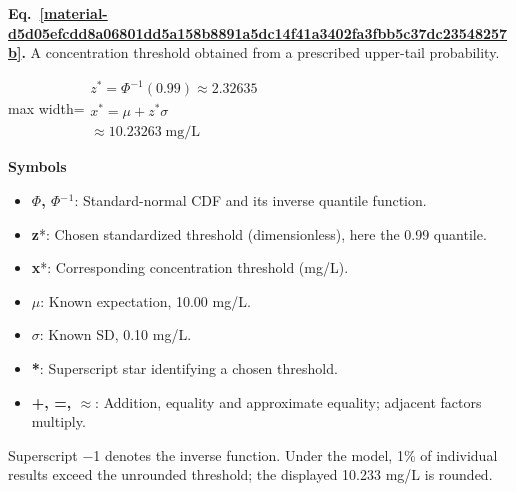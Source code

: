 \documentclass[11pt,a4paper]{article}
\begin{document}
\par\medskip
\begin{samepage}
\label{material-d5d05efcdd8a06801dd5a158b8891a5dc14f41a3402fa3fbb5c37dc23548257b}
\noindent\textbf{Eq.~\ref*{material-d5d05efcdd8a06801dd5a158b8891a5dc14f41a3402fa3fbb5c37dc23548257b}.} A concentration threshold obtained from a prescribed upper-tail probability.\par\nopagebreak
\begin{center}\begin{adjustbox}{max width=\linewidth}$\displaystyle \begin{gathered}z^*=\Phi^{-1}(0.99)\approx2.32635\\x^*=\mu+z^*\sigma\\\approx10.23263\;\mathrm{mg/L}\end{gathered}$\end{adjustbox}\end{center}

\par\noindent\textbf{Symbols}

\begin{itemize}\setlength{\itemsep}{1pt}\setlength{\parsep}{0pt}
\item \textbf{\ensuremath{\Phi}, \ensuremath{\Phi}\ensuremath{{}^-}\ensuremath{{}^1}}: Standard-normal CDF and its inverse quantile function.
\item \textbf{z}*: Chosen standardized threshold (dimensionless), here the 0.99 quantile.
\item \textbf{x}*: Corresponding concentration threshold (mg/L).
\item \textbf{\ensuremath{\mu}}: Known expectation, 10.00 mg/L.
\item \textbf{\ensuremath{\sigma}}: Known SD, 0.10 mg/L.
\item \textbf{*}: Superscript star identifying a chosen threshold.
\item \textbf{+, =, \ensuremath{\approx}}: Addition, equality and approximate equality; adjacent factors multiply.
\end{itemize}

Superscript \ensuremath{-}1 denotes the inverse function. Under the model, 1\% of individual results exceed the unrounded threshold; the displayed 10.233 mg/L is rounded.

\end{samepage}
\medskip
\end{document}
